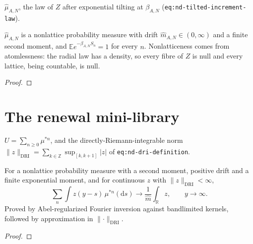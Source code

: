 \begin{definition}
  \label{def:nd-tilted-increment-law}
  \leanok
  $\widehat\mu_{A,N}$, the law of $Z$ after exponential tilting at
  $\beta_{A,N}$ (\texttt{eq:nd-tilted-increment-law}).
\end{definition}

\begin{lemma}
  \label{lem:nd-tilted-increment-law-properties}
  \leanok
  $\widehat\mu_{A,N}$ is a nonlattice probability measure with drift
  $\widehat m_{A,N}\in(0,\infty)$ and a finite second moment, and
  $\mathbb E e^{-\beta_{A,N}S_n}=1$ for every $n$.  Nonlatticeness comes from
  atomlessness: the radial law has a density, so every fibre of $Z$ is null and
  every lattice, being countable, is null.
\end{lemma}
\begin{proof}\leanok\end{proof}

\section{The renewal mini-library}

\begin{definition}
  \label{def:nd-renewal-measure}
  \leanok
  $U=\sum_{n\ge0}\mu^{*n}$, and the directly-Riemann-integrable norm
  $\lVert z\rVert_{\mathrm{DRI}}=\sum_{k\in\mathbb Z}\sup_{[k,k+1]}|z|$ of
  \texttt{eq:nd-dri-definition}.
\end{definition}

\begin{theorem}
  \label{thm:nd-key-renewal}
  \leanok
  For a nonlattice probability measure with a second moment, positive drift and
  a finite exponential moment, and for continuous $z$ with
  $\lVert z\rVert_{\mathrm{DRI}}<\infty$,
  \[
    \sum_n\int z(y-s)\,\mu^{*n}(\mathrm ds)\longrightarrow
    \frac{1}{\widehat m}\int_{\mathbb R} z ,\qquad y\to\infty .
  \]
  Proved by Abel-regularized Fourier inversion against bandlimited kernels,
  followed by approximation in $\lVert\cdot\rVert_{\mathrm{DRI}}$.
\end{theorem}
\begin{proof}\leanok\end{proof}

